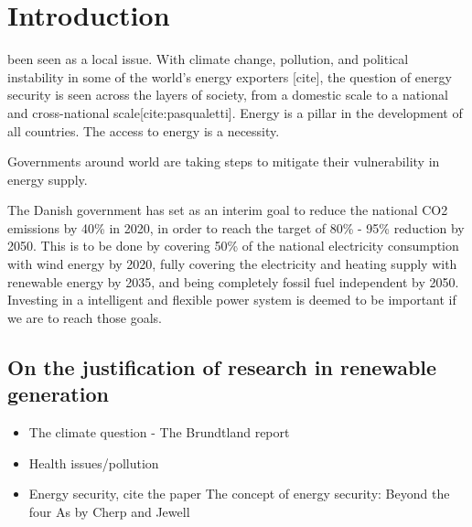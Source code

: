 \chapter{Introduction}

 been seen as a local issue. With climate change, pollution, and political instability in some of the world's energy exporters [cite], the question of energy security is seen across the layers of society, from a domestic scale to a national and cross-national scale[cite:pasqualetti].
Energy is a pillar in the development of all countries. The access to energy is a necessity.

Governments around world are taking steps to mitigate their vulnerability in energy supply.

The Danish government has set as an interim goal to reduce the national CO2 emissions by 40\% in 2020, in order to reach the target of 80\% - 95\% reduction by 2050. This is to be done by covering 50\% of the national electricity consumption with wind energy by 2020, fully covering the electricity and heating supply with renewable energy by 2035, and being completely fossil fuel independent by 2050. Investing in a intelligent and flexible power system is deemed to be important if we are to reach those goals.

\section{On the justification of research in renewable generation} %
\label{sec:justification}
\begin{itemize}
	\item The climate question - The Brundtland report
	\item Health issues/pollution
	\item Energy security, cite the paper The concept of energy security: Beyond the four As by Cherp and Jewell
\end{itemize}



